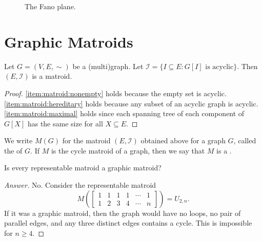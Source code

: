\begin{figure}[htbp]
    \centering
    \caption{The Fano plane.}
    \label{fig:fano}
\end{figure}

\section{Graphic Matroids}

Let \(G = (V, E, \sim)\) be a (multi)graph.
Let \(\mathcal{I} = \{ I \subseteq E : G[I] \text{ is acyclic} \}\).
Then \((E, \mathcal{I})\) is a matroid.

\begin{proof}
    \ref{item:matroid:nonempty} holds because the empty set is acyclic.
    \ref{item:matroid:hereditary} holds because any subset of an acyclic graph is acyclic.
    \ref{item:matroid:maximal} holds since each spanning tree of each component of \(G[X]\) has the same size for all \(X \subseteq E\).
\end{proof}

We write \(M(G)\) for the matroid \((E, \mathcal{I})\) obtained above for a graph \(G\),
called the  of \(G\).
If \(M\) is the cycle matroid of a graph, then we say that \(M\) is a .

\begin{question}
    Is every representable matroid a graphic matroid?
\end{question}

\begin{proof}[Answer]
    No.
    Consider the representable matroid
    \begin{equation}
        M\left(
            \begin{bmatrix} 
                1 & 1 & 1 & 1 & \cdots & 1 \\
                1 & 2 & 3 & 4 & \cdots & n 
            \end{bmatrix}
        \right)
        = U_{2, n}.
    \end{equation}
    If it was a graphic matroid,
    then the graph would have no loops,
    no pair of parallel edges,
    and any three distinct edges contains a cycle.
    This is impossible for \(n \geq 4\).
\end{proof}

